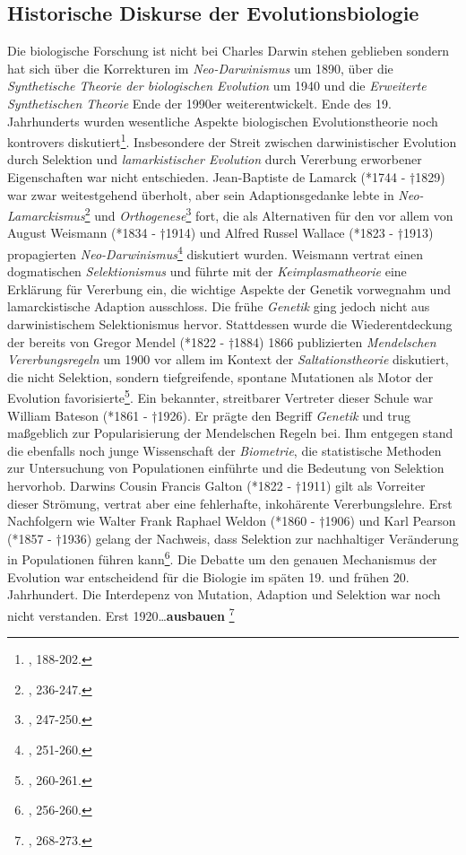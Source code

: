 \documentclass[openany,twoside,twocolumn]{book}
\let\rmarkdownfootnote\footnote%
\def\footnote{\protect\rmarkdownfootnote}
\begin{document}
\hypertarget{historische-diskurse-der-evolutionsbiologie}{%
\subsection{Historische Diskurse der
Evolutionsbiologie}\label{historische-diskurse-der-evolutionsbiologie}}

Die biologische Forschung ist nicht bei Charles Darwin stehen geblieben
sondern hat sich über die Korrekturen im \emph{Neo-Darwinismus} um 1890,
über die \emph{Synthetische Theorie der biologischen Evolution} um 1940
und die \emph{Erweiterte Synthetischen Theorie} Ende der 1990er
weiterentwickelt. Ende des 19. Jahrhunderts wurden wesentliche Aspekte
biologischen Evolutionstheorie noch kontrovers diskutiert\footnote{\textcite{bowler_evolution_1989},
  188-202.}. Insbesondere der Streit zwischen darwinistischer Evolution
durch Selektion und \emph{lamarkistischer Evolution} durch Vererbung
erworbener Eigenschaften war nicht entschieden. Jean-Baptiste de Lamarck
(*1744 - †1829) war zwar weitestgehend überholt, aber sein
Adaptionsgedanke lebte in \emph{Neo-Lamarckismus}\footnote{\textcite{bowler_evolution_1989},
  236-247.} und \emph{Orthogenese}\footnote{\textcite{bowler_evolution_1989},
  247-250.} fort, die als Alternativen für den vor allem von August
Weismann (*1834 - †1914) und Alfred Russel Wallace (*1823 - †1913)
propagierten \emph{Neo-Darwinismus}\footnote{\textcite{bowler_evolution_1989},
  251-260.} diskutiert wurden. Weismann vertrat einen dogmatischen
\emph{Selektionismus} und führte mit der \emph{Keimplasmatheorie} eine
Erklärung für Vererbung ein, die wichtige Aspekte der Genetik vorwegnahm
und lamarckistische Adaption ausschloss. Die frühe \emph{Genetik} ging
jedoch nicht aus darwinistischem Selektionismus hervor. Stattdessen
wurde die Wiederentdeckung der bereits von Gregor Mendel (*1822 - †1884)
1866 publizierten \emph{Mendelschen Vererbungsregeln} um 1900 vor allem
im Kontext der \emph{Saltationstheorie} diskutiert, die nicht Selektion,
sondern tiefgreifende, spontane Mutationen als Motor der Evolution
favorisierte\footnote{\textcite{bowler_evolution_1989}, 260-261.}. Ein
bekannter, streitbarer Vertreter dieser Schule war William Bateson
(*1861 - †1926). Er prägte den Begriff \emph{Genetik} und trug
maßgeblich zur Popularisierung der Mendelschen Regeln bei. Ihm entgegen
stand die ebenfalls noch junge Wissenschaft der \emph{Biometrie}, die
statistische Methoden zur Untersuchung von Populationen einführte und
die Bedeutung von Selektion hervorhob. Darwins Cousin Francis Galton
(*1822 - †1911) gilt als Vorreiter dieser Strömung, vertrat aber eine
fehlerhafte, inkohärente Vererbungslehre. Erst Nachfolgern wie Walter
Frank Raphael Weldon (*1860 - †1906) und Karl Pearson (*1857 - †1936)
gelang der Nachweis, dass Selektion zur nachhaltiger Veränderung in
Populationen führen kann\footnote{\textcite{bowler_evolution_1989},
  256-260.}. Die Debatte um den genauen Mechanismus der Evolution war
entscheidend für die Biologie im späten 19. und frühen 20. Jahrhundert.
Die Interdepenz von Mutation, Adaption und Selektion war noch nicht
verstanden. Erst 1920\ldots{}\textbf{ausbauen} \footnote{\textcite{bowler_evolution_1989},
  268-273.}
\end{document}
